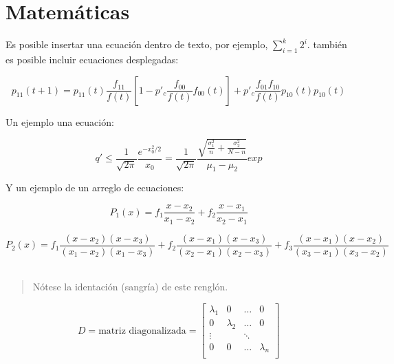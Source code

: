 \documentclass[11pt]{article}
\begin{document}
    \section{\Large Matemáticas} \vspace{-10pt}
        Es posible insertar una ecuación dentro de texto, por ejemplo, $\sum_{i=1}^k 2^i$. también es posible incluir ecuaciones desplegadas: \vspace{0.5cm}

        \begin{equation}
            p_{11}(t + 1) = p_{11}(t) \frac{f_{11}}{f(t)} \left[1 - p'_c\frac{f_{00}}{f(t)}f_{00}(t)\right] + p'_c \frac{f_{01}f_{10}}{f(t)} p_{10}(t)p_{10}(t)
        \end{equation}

        Un ejemplo una ecuación: \vspace{0.5cm}
        
        \begin{equation}
            q' \leq \frac{1}{\sqrt{2\pi}}\frac{e^{-x_{0}^{2}/{2}}}{x_{0}} = \frac{1}{\sqrt{2\pi}}\frac{\sqrt{\frac{\sigma_{1}^{2}}{n}+\frac{\sigma_{2}^{2}}{N-n}}}{\mu_{1}-\mu_{2}}exp
        \end{equation} \vspace{0.5cm}
        
        Y un ejemplo de un arreglo de ecuaciones:

        \begin{equation}
            P_1(x) = f_1\frac{x-x_2}{x_1-x_2} + f_2\frac{x-x_1}{x_2-x_1}
        \end{equation}

        \begin{equation}
            P_2(x) = f_1\frac{(x-x_2)(x-x_3)}{(x_1-x_2)(x_1-x_3)} + f_2\frac{(x-x_1)(x-x_3)}{(x_2-x_1)(x_2-x_3)} + f_3\frac{(x-x_1)(x-x_2)}{(x_3-x_1)(x_3-x_2)}
        \end{equation}\ \vspace{0.5cm}
        
        \begin{quote}
            \indent Nótese la identación (sangría) de este renglón.
        \end{quote}

        \begin{equation}
            D = \text{matriz diagonalizada} = 
            \begin{bmatrix}
                \lambda_1 & 0          & \dots      & 0         \\
                0         & \lambda_2  & \dots      & 0         \\
                \vdots    &            & \ddots     &           \\
                0         & 0          & \dots      & \lambda_n \\
            \end{bmatrix}
        \end{equation}       
\end{document}
